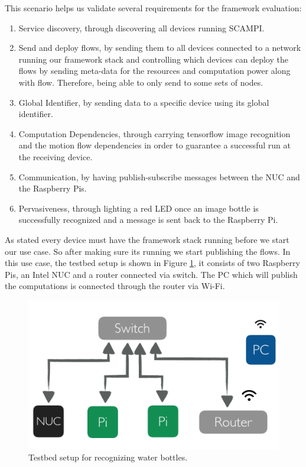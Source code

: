 This scenario helps us validate several requirements for the framework evaluation: 
\begin{enumerate}
	
	\item Service discovery, through discovering all devices running SCAMPI.
	\item Send and deploy flows, by sending them to all devices connected to a network  running our framework stack and controlling which devices can deploy the flows by sending meta-data for the resources and computation power along with flow. Therefore, being able to only send to some sets of nodes.
	\item Global Identifier, by sending data  to a  specific device using its global identifier.

	\item Computation Dependencies, through carrying tensorflow image recognition and the motion flow dependencies in order to guarantee a successful run at the receiving device.

	\item Communication, by having publish-subscribe messages between the NUC and the Raspberry Pis.
	
	
	\item Pervasiveness, through lighting a red LED once an image bottle is successfully recognized and a message is sent back to the Raspberry Pi.

\end{enumerate}

\noindent As stated every device must have the framework stack running before we start our use case. So after making sure its running we start publishing the flows. In this use case, the testbed setup is shown in Figure \ref{fig:tb-tensor}, it consists of two Raspberry Pis, an Intel NUC and a router connected via switch. The PC which will publish the computations is connected through the router via Wi-Fi. 
 \begin{figure}[H]
	\centering
	\includegraphics[scale=0.6]{images/tb-tensor.png}
	\caption{Testbed setup for recognizing water bottles.}
	\label{fig:tb-tensor}
\end{figure} 



